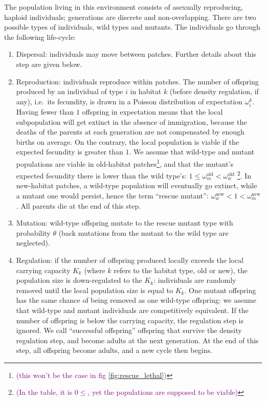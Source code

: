 \documentclass[11pt]{article}
\newcommand{\florence}[1]{\textcolor{purple}{(#1)}} %
\begin{document}
The population living in this environment consists of asexually reproducing, haploid individuals; generations are discrete and non-overlapping. There are two possible types of individuals, wild types and mutants. The individuals go through the following life-cycle: \begin{enumerate}[label = (\roman*)]
	\item Dispersal: individuals may move between patches. Further details about this step are given below.
	\item Reproduction: individuals reproduce within patches. The number of offspring produced by an individual of type $i$ in habitat $k$ (before density regulation, if any), i.e.\ its fecundity, is drawn in a Poisson distribution of expectation $\omega_i^k$. Having fewer than $1$ offspring in expectation means that the local subpopulation will get extinct in the absence of immigration, because the deaths of the parents at each generation are not compensated by enough births on average. On the contrary, the local population is viable if the expected fecundity is greater than $1$. We assume that wild-type and mutant populations are viable in old-habitat patches\footnote{\florence{this won't be the case in fig \ref{fig:rescue_lethal}}}, and that the mutant's expected fecundity there is lower than the wild type's: $1 \leq \omega^{\text{old}}_m < \omega^{\text{old}}_w$ \footnote{\florence{In the table, it is $0 \leq $, yet the populations are supposed to be viable}}. In new-habitat patches, a wild-type population will eventually go extinct, while a mutant one would persist, hence the term ``rescue mutant'': $\omega^{\text{new}}_w < 1 < \omega^{\text{new}}_m$. 
	All parents die at the end of this step.
	\item {} Mutation: wild-type offspring mutate to the rescue mutant type with probability $\theta$ (back mutations from the mutant to the wild type are neglected).
	\item {}Regulation: if the number of offspring produced locally exceeds the local carrying capacity $K_k$ (where $k$ refers to the habitat type, old or new), the population size is down-regulated to the $K_k$: individuals are randomly removed until the local population size is equal to $K_k$. One mutant offspring has the same chance of being removed as one wild-type offspring:  we assume that wild-type and mutant individuals are competitively equivalent. If the number of offspring is below the carrying capacity, the regulation step is ignored. We call ``successful offspring'' offspring that survive the density regulation step, and become adults at the next generation. 
	At the end of this step, all offspring become adults, and a new cycle then begins.
\end{enumerate}
\end{document}
